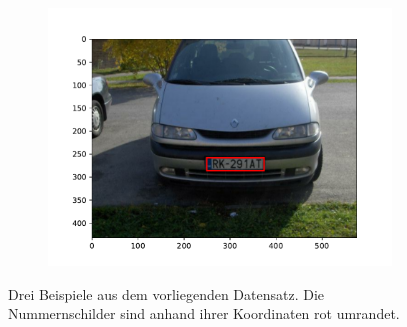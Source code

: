 \begin{figure}
\begin{subfigure}{0.32\textwidth}
        \includegraphics[width=\textwidth]{abbildungen/car_3}
    \end{subfigure}
    \caption{Drei Beispiele aus dem vorliegenden Datensatz.
        Die Nummernschilder sind anhand ihrer Koordinaten rot umrandet.}
    \label{fig:autos}
\end{figure}